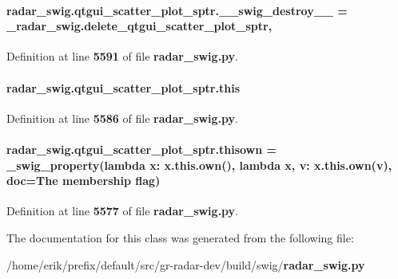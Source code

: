 \paragraph[{\+\_\+\+\_\+swig\+\_\+destroy\+\_\+\+\_\+}]{\setlength{\rightskip}{0pt plus 5cm}radar\+\_\+swig.\+qtgui\+\_\+scatter\+\_\+plot\+\_\+sptr.\+\_\+\+\_\+swig\+\_\+destroy\+\_\+\+\_\+ = \+\_\+radar\+\_\+swig.\+delete\+\_\+qtgui\+\_\+scatter\+\_\+plot\+\_\+sptr\hspace{0.3cm}{\ttfamily [static]}, {\ttfamily [private]}}\label{classradar__swig_1_1qtgui__scatter__plot__sptr_a989bc9eb4312276bf7cc28bfbebd1b6a}


Definition at line {\bf 5591} of file {\bf radar\+\_\+swig.\+py}.

\paragraph[{this}]{\setlength{\rightskip}{0pt plus 5cm}radar\+\_\+swig.\+qtgui\+\_\+scatter\+\_\+plot\+\_\+sptr.\+this}\label{classradar__swig_1_1qtgui__scatter__plot__sptr_aaf8deb896ea19a03b69399bcfc85a31a}


Definition at line {\bf 5586} of file {\bf radar\+\_\+swig.\+py}.

\paragraph[{thisown}]{\setlength{\rightskip}{0pt plus 5cm}radar\+\_\+swig.\+qtgui\+\_\+scatter\+\_\+plot\+\_\+sptr.\+thisown = {\bf \+\_\+swig\+\_\+property}(lambda x\+: x.\+this.\+own(), lambda {\bf x}, v\+: x.\+this.\+own(v), doc=\textquotesingle{}The membership flag\textquotesingle{})\hspace{0.3cm}{\ttfamily [static]}}\label{classradar__swig_1_1qtgui__scatter__plot__sptr_aad1880a7cc4a9aa4d7bd58d9580ca0b6}


Definition at line {\bf 5577} of file {\bf radar\+\_\+swig.\+py}.



The documentation for this class was generated from the following file\+:\begin{DoxyCompactItemize}
\item 
/home/erik/prefix/default/src/gr-\/radar-\/dev/build/swig/{\bf radar\+\_\+swig.\+py}\end{DoxyCompactItemize}
